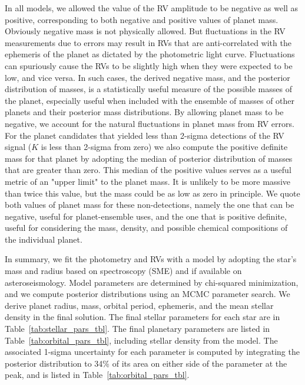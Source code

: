 \documentclass{emulateapj}
\begin{document}
In all models, we allowed the value of the RV amplitude to be negative
 as well as positive, corresponding to both negative and positive
 values of planet mass.  Obviously negative mass is not physically
 allowed.  But fluctuations in the RV measurements due to errors may
 result in RVs that are anti-correlated with the ephemeris of the
 planet as dictated by the photometric light curve.  Fluctuations can
 spuriously cause the RVs to be slightly high when they were expected
 to be low, and vice versa.  In such cases, the derived negative mass,
 and the posterior distribution of masses, is a statistically useful
 measure of the possible masses of the planet, especially useful when
 included with the ensemble of masses of other planets and their
 posterior mass distributions.  By allowing planet mass to be
 negative, we account for the natural fluctuations in planet mass from
 RV errors.  For the planet candidates that yielded less than 2-sigma
 detections of the RV signal ($K$ is less than 2-sigma from zero) we
 also compute the positive definite mass for that planet by adopting
 the median of posterior distribution of masses that are greater than
 zero.  This median of the positive values serves as a useful metric
 of an "upper limit" to the planet mass.  It is unlikely to be more
 massive than twice this value, but the mass could be as low as zero
 in principle.  We quote both values of planet mass for these
 non-detections, namely the one that can be negative, useful for
 planet-ensemble uses, and the one that is positive definite, useful
 for considering the mass, density, and possible chemical compositions
 of the individual planet.

In summary, we fit the photometry and RVs with a \cite{Mandel2002}
 model by adopting the star's mass and radius based on spectroscopy
 (SME) and if available on asteroseismology. Model parameters are
 determined by chi-squared minimization, and we compute posterior
 distributions using an MCMC parameter search.  We derive planet
 radius, mass, orbital period, ephemeris, and the mean stellar density
 in the final solution. The final stellar parameters for each star are
 in Table~\ref{tab:stellar_pars_tbl}.  The final planetary parameters
 are listed in Table~\ref{tab:orbital_pars_tbl}, including stellar
 density from the model.  The associated 1-sigma uncertainty for each
 parameter is computed by integrating the posterior distribution to
 34\% of its area on either side of the parameter at the peak, and is
 listed in Table~\ref{tab:orbital_pars_tbl}.
\end{document}
